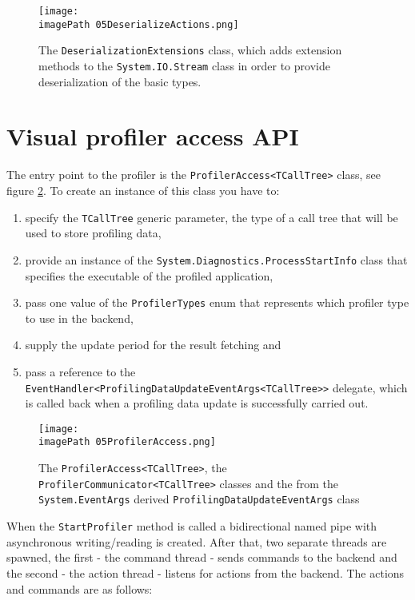 \begin{figure}
	\centering
		\texttt{[image: \\imagePath 05DeserializeActions.png]}
		\caption{The \texttt{DeserializationExtensions} class, which adds extension methods to the \texttt{System.IO.Stream} class in order to provide deserialization of the basic types. }
	\label{fig:05DeserializeActions}
\end{figure}

\section{Visual profiler access API}
The entry point to the profiler is the \texttt{ProfilerAccess\textless TCallTree\textgreater} class, see figure \ref{fig:05ProfilerAccess}. To create an instance of this class you have to:
\begin{enumerate}

\item specify the \texttt{TCallTree} generic parameter, the type of a call tree that will be used to store profiling data,

\item provide an instance of the \texttt{System.Diagnostics.ProcessStartInfo} class that specifies the executable of the profiled application,

\item pass one value of the \texttt{ProfilerTypes} enum that represents which profiler type to use in the backend,

\item supply the update period for the result fetching and

\item pass a reference to the \texttt{EventHandler\textless ProfilingDataUpdateEventArgs\textless TCallTree\textgreater\textgreater} delegate, which is called back when a profiling data update is successfully carried out.
 
\end{enumerate}
\begin{figure}
	\centering
		\texttt{[image: \\imagePath 05ProfilerAccess.png]}
		\caption{The \texttt{ProfilerAccess\textless TCallTree\textgreater},
the \texttt{ProfilerCommunicator\textless TCallTree\textgreater} 		
		 classes and the from the \texttt{System.EventArgs} derived \texttt{ProfilingDataUpdateEventArgs} class}
	\label{fig:05ProfilerAccess}
\end{figure}

When the \texttt{StartProfiler} method is called a bidirectional named pipe with asynchronous writing/reading is created. After that, two separate threads are spawned, the first - the command thread - sends commands to the backend and the second - the action thread - listens for actions from the backend. The actions and commands are as follows:

